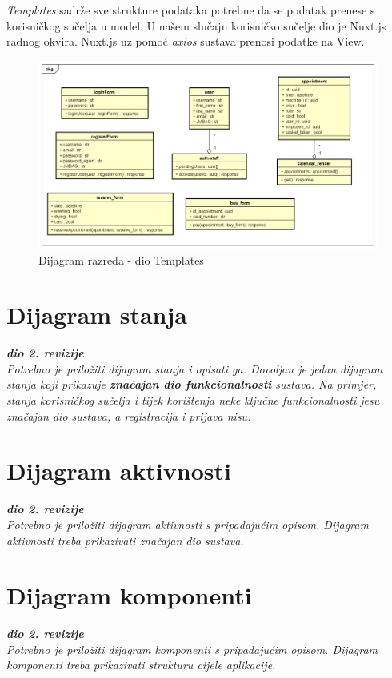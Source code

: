 		 	\pagebreak			
 			\emph{Templates} sadrže sve strukture podataka potrebne da se podatak prenese s korisničkog sučelja u model. U našem slučaju korisničko sučelje dio je Nuxt.js radnog okvira. Nuxt.js uz pomoć \emph{axios} sustava prenosi podatke na View.
 			\begin{figure}[H]
 				\includegraphics[scale=0.45]{slike/Razredni_dijagrami_Templates.PNG}
 				\centering
 				\caption{Dijagram razreda - dio Templates}
 				\label{fig:promjene}
 			\end{figure} 	
 		
			\pagebreak
 			
 			
		\section{Dijagram stanja}
			
			
			\textbf{\textit{dio 2. revizije}}\\
			
			\textit{Potrebno je priložiti dijagram stanja i opisati ga. Dovoljan je jedan dijagram stanja koji prikazuje \textbf{značajan dio funkcionalnosti} sustava. Na primjer, stanja korisničkog sučelja i tijek korištenja neke ključne funkcionalnosti jesu značajan dio sustava, a registracija i prijava nisu. }
			
			
			\eject 
		
		\section{Dijagram aktivnosti}
			
			\textbf{\textit{dio 2. revizije}}\\
			
			 \textit{Potrebno je priložiti dijagram aktivnosti s pripadajućim opisom. Dijagram aktivnosti treba prikazivati značajan dio sustava.}
			
			\eject
		\section{Dijagram komponenti}
		
			\textbf{\textit{dio 2. revizije}}\\
		
			 \textit{Potrebno je priložiti dijagram komponenti s pripadajućim opisom. Dijagram komponenti treba prikazivati strukturu cijele aplikacije.}